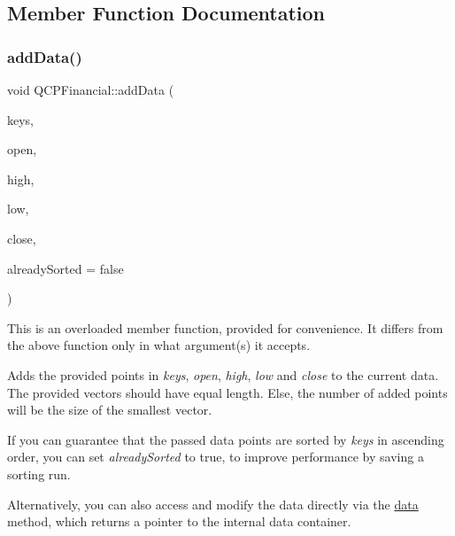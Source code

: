\subsection{Member Function Documentation}
\mbox{\label{class_q_c_p_financial_a372ac031e44a7a6c912d203556af96f7}} 
\subsubsection{\texorpdfstring{add\+Data()}{addData()}\hspace{0.1cm}{\footnotesize\ttfamily [1/2]}}
{\footnotesize\ttfamily void Q\+C\+P\+Financial\+::add\+Data (\begin{DoxyParamCaption}\item[{const \hyperlink{class_q_vector}{Q\+Vector}$<$ double $>$ \&}]{keys,  }\item[{const \hyperlink{class_q_vector}{Q\+Vector}$<$ double $>$ \&}]{open,  }\item[{const \hyperlink{class_q_vector}{Q\+Vector}$<$ double $>$ \&}]{high,  }\item[{const \hyperlink{class_q_vector}{Q\+Vector}$<$ double $>$ \&}]{low,  }\item[{const \hyperlink{class_q_vector}{Q\+Vector}$<$ double $>$ \&}]{close,  }\item[{bool}]{already\+Sorted = {\ttfamily false} }\end{DoxyParamCaption})}

This is an overloaded member function, provided for convenience. It differs from the above function only in what argument(s) it accepts.

Adds the provided points in {\itshape keys}, {\itshape open}, {\itshape high}, {\itshape low} and {\itshape close} to the current data. The provided vectors should have equal length. Else, the number of added points will be the size of the smallest vector.

If you can guarantee that the passed data points are sorted by {\itshape keys} in ascending order, you can set {\itshape already\+Sorted} to true, to improve performance by saving a sorting run.

Alternatively, you can also access and modify the data directly via the \hyperlink{class_q_c_p_financial_aec3f666271cf48bd7b87d84fe3f8c074}{data} method, which returns a pointer to the internal data container.

